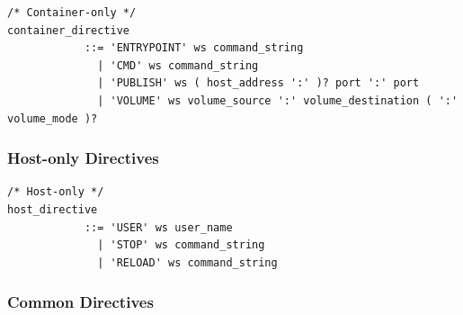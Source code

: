 \documentclass[a4paper,11pt]{article}
\begin{document}
\begin{lstlisting}
/* Container-only */
container_directive
            ::= 'ENTRYPOINT' ws command_string
              | 'CMD' ws command_string
              | 'PUBLISH' ws ( host_address ':' )? port ':' port
              | 'VOLUME' ws volume_source ':' volume_destination ( ':' volume_mode )?
\end{lstlisting}

\subsubsection{Host-only Directives}

\begin{lstlisting}
/* Host-only */
host_directive
            ::= 'USER' ws user_name
              | 'STOP' ws command_string
              | 'RELOAD' ws command_string
\end{lstlisting}

\subsubsection{Common Directives}
\end{document}
